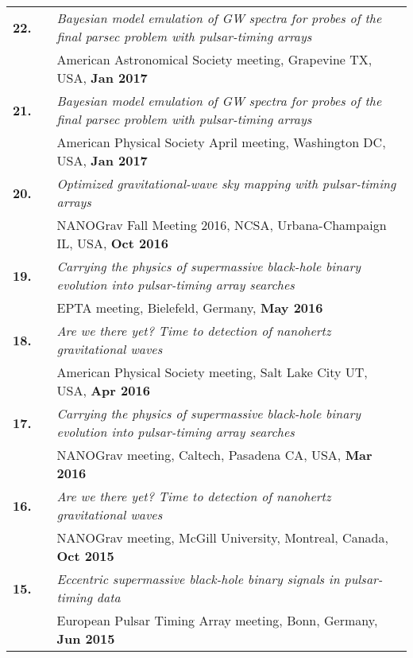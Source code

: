 \documentclass[11pt,letterpaper,sans]{moderncv}
\begin{document}
{\begin{longtable}{rp{0.3cm}p{15.8cm}}
\textbf{22.} & & \textit{Bayesian model emulation of GW spectra for probes of the final parsec problem with pulsar-timing arrays} \\ 
&& American Astronomical Society meeting, Grapevine TX, USA, \textbf{Jan 2017} \vspace{0.09cm}\\
\textbf{21.} & & \textit{Bayesian model emulation of GW spectra for probes of the final parsec problem with pulsar-timing arrays} \\ 
&& American Physical Society April meeting, Washington DC, USA, \textbf{Jan 2017} \vspace{0.09cm}\\
\textbf{20.} & & \textit{Optimized gravitational-wave sky mapping with pulsar-timing arrays} \\ 
&& NANOGrav Fall Meeting 2016, NCSA, Urbana-Champaign IL, USA, \textbf{Oct 2016} \vspace{0.09cm}\\
\textbf{19.} & & \textit{Carrying the physics of supermassive black-hole binary evolution into pulsar-timing array searches} \\ 
&& EPTA meeting, Bielefeld, Germany, \textbf{May 2016} \vspace{0.09cm}\\
\textbf{18.} & & \textit{Are we there yet? Time to detection of nanohertz gravitational waves} \\ 
&& American Physical Society meeting, Salt Lake City UT, USA, \textbf{Apr 2016} \vspace{0.09cm}\\
\textbf{17.} & & \textit{Carrying the physics of supermassive black-hole binary evolution into pulsar-timing array searches} \\ 
&& NANOGrav meeting, Caltech, Pasadena CA, USA, \textbf{Mar 2016} \vspace{0.09cm}\\
\textbf{16.} & & \textit{Are we there yet? Time to detection of nanohertz gravitational waves} \\ 
&& NANOGrav meeting, McGill University, Montreal, Canada, \textbf{Oct 2015} \vspace{0.09cm}\\
\textbf{15.} & & \textit{Eccentric supermassive black-hole binary signals in pulsar-timing data} \\ 
&& European Pulsar Timing Array meeting, Bonn, Germany, \textbf{Jun 2015} \vspace{0.09cm}\\

\end{longtable}}
\end{document}
